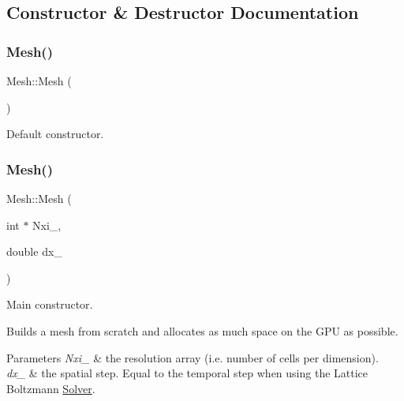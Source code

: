 \subsection{Constructor \& Destructor Documentation}
\mbox{\label{classMesh_a2af137f1571af89172b9c102302c416b}} 
\subsubsection{\texorpdfstring{Mesh()}{Mesh()}\hspace{0.1cm}{\footnotesize\ttfamily [1/2]}}
{\footnotesize\ttfamily Mesh\+::\+Mesh (\begin{DoxyParamCaption}{ }\end{DoxyParamCaption})\hspace{0.3cm}{\ttfamily [inline]}}



Default constructor. 

\mbox{\label{classMesh_ae13aff57d73893651b5386ecdba97cd3}} 
\subsubsection{\texorpdfstring{Mesh()}{Mesh()}\hspace{0.1cm}{\footnotesize\ttfamily [2/2]}}
{\footnotesize\ttfamily Mesh\+::\+Mesh (\begin{DoxyParamCaption}\item[{int $\ast$}]{Nxi\+\_\+,  }\item[{double}]{dx\+\_\+ }\end{DoxyParamCaption})\hspace{0.3cm}{\ttfamily [inline]}}



Main constructor. 

Builds a mesh from scratch and allocates as much space on the G\+PU as possible. 
\begin{DoxyParams}{Parameters}
{\em Nxi\+\_\+} & the resolution array (i.\+e. number of cells per dimension). \\
\hline
{\em dx\+\_\+} & the spatial step. Equal to the temporal step when using the Lattice Boltzmann \hyperlink{classSolver}{Solver}. \\
\hline
\end{DoxyParams}
\mbox{\label{classMesh_a5efe4da1a4c0971cfb037bd70304c303}} 
